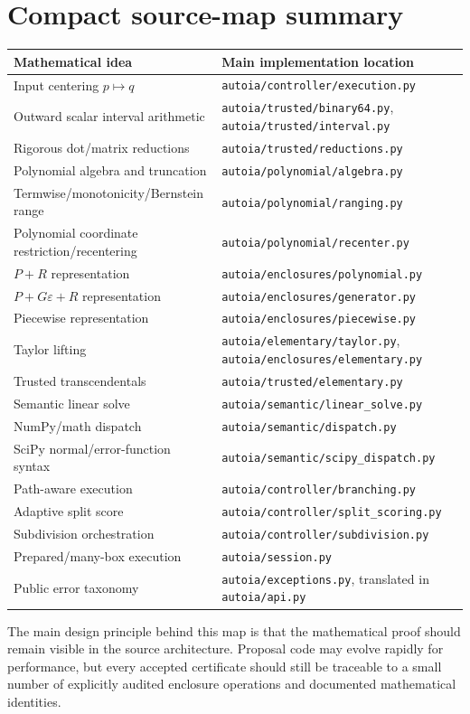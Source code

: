 \documentclass[11pt]{article}
\newcommand{\codepath}[1]{\nolinkurl{#1}}
\begin{document}
\section{Compact source-map summary}

\begin{longtable}{p{}p{}}
\toprule
Mathematical idea & Main implementation location \\
\midrule
\endhead
Input centering \(p\mapsto q\) & \codepath{autoia/controller/execution.py} \\
Outward scalar interval arithmetic & \codepath{autoia/trusted/binary64.py}, \codepath{autoia/trusted/interval.py} \\
Rigorous dot/matrix reductions & \codepath{autoia/trusted/reductions.py} \\
Polynomial algebra and truncation & \codepath{autoia/polynomial/algebra.py} \\
Termwise/monotonicity/Bernstein range & \codepath{autoia/polynomial/ranging.py} \\
Polynomial coordinate restriction/recentering & \codepath{autoia/polynomial/recenter.py} \\
\(P+R\) representation & \codepath{autoia/enclosures/polynomial.py} \\
\(P+G\varepsilon+R\) representation & \codepath{autoia/enclosures/generator.py} \\
Piecewise representation & \codepath{autoia/enclosures/piecewise.py} \\
Taylor lifting & \codepath{autoia/elementary/taylor.py}, \codepath{autoia/enclosures/elementary.py} \\
Trusted transcendentals & \codepath{autoia/trusted/elementary.py} \\
Semantic linear solve & \codepath{autoia/semantic/linear_solve.py} \\
NumPy/math dispatch & \codepath{autoia/semantic/dispatch.py} \\
SciPy normal/error-function syntax & \codepath{autoia/semantic/scipy_dispatch.py} \\
Path-aware execution & \codepath{autoia/controller/branching.py} \\
Adaptive split score & \codepath{autoia/controller/split_scoring.py} \\
Subdivision orchestration & \codepath{autoia/controller/subdivision.py} \\
Prepared/many-box execution & \codepath{autoia/session.py} \\
Public error taxonomy & \codepath{autoia/exceptions.py}, translated in \codepath{autoia/api.py} \\
\bottomrule
\end{longtable}

The main design principle behind this map is that the mathematical proof should
remain visible in the source architecture.  Proposal code may evolve rapidly for
performance, but every accepted certificate should still be traceable to a small
number of explicitly audited enclosure operations and documented mathematical
identities.
\end{document}

